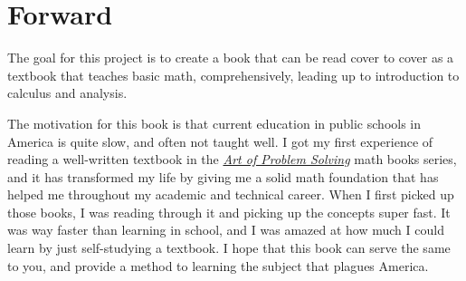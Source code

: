 \chapter*{Forward}

The goal for this project is to create a book that can be read cover to cover as a textbook that teaches basic math, comprehensively, leading up to introduction to calculus and analysis.

The motivation for this book is that current education in public schools in America is quite slow, and often not taught well.
I got my first experience of reading a well-written textbook in the \href{https://artofproblemsolving.com/}{\textit{Art of Problem Solving}} math books series, and it has transformed my life by giving me a solid math foundation that has helped me throughout my academic and technical career.
When I first picked up those books, I was reading through it and picking up the concepts super fast. It was way faster than learning in school, and I was amazed at how much I could learn by just self-studying a textbook.
I hope that this book can serve the same to you, and provide a method to learning the subject that plagues America.